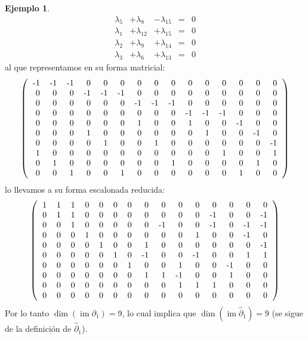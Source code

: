 \documentclass[12pt]{book}
\theoremstyle{definition}
\newtheorem{example}[theorem]{Ejemplo}
\DeclareMathOperator{\im}{im}
\newcounter{in}
\newcounter{ini}
\begin{document}
\begin{example}
\[\begin{array}{rrrrr}
   \lambda_{5} & +\lambda_{8} & -\lambda_{15} & = & 0 \\
   \lambda_{1} & +\lambda_{12} & +\lambda_{15} & = & 0 \\
   \lambda_{2} & +\lambda_{9} & +\lambda_{14} & = & 0 \\
   \lambda_{3} & +\lambda_{6} & +\lambda_{13} & = & 0 
 \end{array}\]
al que representamos en su forma matricial:
\[ \left(
  \begin{tabular}{rrrrrrrrrrrrrrr}
    -1 & -1 & -1 & 0  & 0  & 0  & 0  & 0  & 0  & 0  & 0  & 0  & 0  & 0  & 0  \\
    0  & 0  & 0  & -1 & -1 & -1 & 0  & 0  & 0  & 0  & 0  & 0  & 0  & 0  & 0  \\
    0  & 0  & 0  & 0  & 0  & 0  & -1 & -1 & -1 & 0  & 0  & 0  & 0  & 0  & 0  \\
    0  & 0  & 0  & 0  & 0  & 0  & 0  & 0  & 0  & -1 & -1 & -1 & 0  & 0  & 0  \\
    0  & 0  & 0  & 0  & 0  & 0  & 1  & 0  & 0  & 1  & 0  & 0  & -1 & 0  & 0  \\
    0  & 0  & 0  & 1  & 0  & 0  & 0  & 0  & 0  & 0  & 1  & 0  & 0  & -1 & 0  \\
    0  & 0  & 0  & 0  & 1  & 0  & 0  & 1  & 0  & 0  & 0  & 0  & 0  & 0  & -1 \\
    1  & 0  & 0  & 0  & 0  & 0  & 0  & 0  & 0  & 0  & 0  & 1  & 0  & 0  & 1  \\
    0  & 1  & 0  & 0  & 0  & 0  & 0  & 0  & 1  & 0  & 0  & 0  & 0  & 1  & 0  \\
    0  & 0  & 1  & 0  & 0  & 1  & 0  & 0  & 0  & 0  & 0  & 0  & 1  & 0  & 0 
  \end{tabular}
\right)\] 
lo llevamos a su forma escalonada reducida:
\[ \left(
  \begin{tabular}{rrrrrrrrrrrrrrr}
    1 & 1 & 1 & 0 & 0 & 0 & 0 & 0  & 0  & 0  & 0  & 0  & 0  & 0  & 0  \\
    0 & 1 & 1 & 0 & 0 & 0 & 0 & 0  & 0  & 0  & 0  & -1 & 0  & 0  & -1 \\
    0 & 0 & 1 & 0 & 0 & 0 & 0 & 0  & -1 & 0  & 0  & -1 & 0  & -1 & -1 \\
    0 & 0 & 0 & 1 & 0 & 0 & 0 & 0  & 0  & 0  & 1  & 0  & 0  & -1 & 0  \\
    0 & 0 & 0 & 0 & 1 & 0 & 0 & 1  & 0  & 0  & 0  & 0  & 0  & 0  & -1 \\
    0 & 0 & 0 & 0 & 0 & 1 & 0 & -1 & 0  & 0  & -1 & 0  & 0  & 1  & 1  \\
    0 & 0 & 0 & 0 & 0 & 0 & 1 & 0  & 0  & 1  & 0  & 0  & -1 & 0  & 0  \\
    0 & 0 & 0 & 0 & 0 & 0 & 0 & 1  & 1  & -1 & 0  & 0  & 1  & 0  & 0  \\
    0 & 0 & 0 & 0 & 0 & 0 & 0 & 0  & 0  & 1  & 1  & 1  & 0  & 0  & 0  \\
    0 & 0 & 0 & 0 & 0 & 0 & 0 & 0  & 0  & 0  & 0  & 0  & 0  & 0  & 0 
  \end{tabular}
\right)\]
Por lo tanto $\dim(\im\partial_{1})=9$, lo cual implica que
$\dim(\im\widehat\partial_{1})=9$ (se sigue de la definición de
$\widehat\partial_{1}$).


\end{example}
\end{document}
